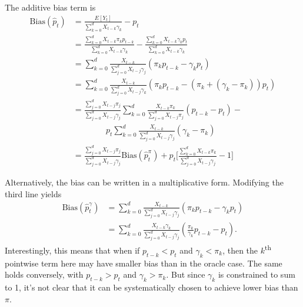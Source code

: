 \documentclass{article}
\begin{document}
The additive bias term is
\begin{align*}%
    \text{Bias}(\hat{p}_t) &= \frac{E[Y_t]}{\sum_{k=0}^d X_{t-k}\gamma_k} - p_t \\
    &= \frac{\sum_{k=0}^d X_{t-k}\pi_k p_{t-k}}{\sum_{k=0}^d X_{t-k}\gamma_k} - \frac{\sum_{k=0}^d X_{t-k}\gamma_k p_t}{\sum_{k=0}^d X_{t-k}\gamma_k} \\
    &= \sum_{k=0}^d \frac{X_{t-k}}{\sum_{j=0}^d X_{t-j}\gamma_j}(\pi_k p_{t-k}-\gamma_k p_t) \\
    &= \sum_{k=0}^d \frac{X_{t-k}}{\sum_{j=0}^d X_{t-j}\gamma_k}(\pi_k p_{t-k}-(\pi_k +(\gamma_k-\pi_k)) p_t) \\
     &= \frac{\sum_{j=0}^d X_{t-j}\pi_j}{\sum_{j=0}^d X_{t-j}\gamma_j}\sum_{k=0}^d \frac{X_{t-k}\pi_k}{\sum_{j=0}^d X_{t-j}\pi_j}(p_{t-k}-p_t) -\\
     &\qquad\qquad p_t\sum_{k=0}^d \frac{X_{t-k}}{\sum_{j=0}^d X_{t-j}\gamma_j}(\gamma_k -\pi_k)  \\
     &= \frac{\sum_{j=0}^d X_{t-j}\pi_j}{\sum_{j=0}^d X_{t-j}\gamma_j}\text{Bias}(\hat{p}_t^\pi) + p_t\Big[ \frac{\sum_{k=0}^d X_{t-k}\pi_k}{\sum_{j=0}^d X_{t-j}\gamma_j}-1\Big]
\end{align*}

Alternatively, the bias can be written in a multiplicative form. Modifying the third line yields
\begin{align}
        \text{Bias}(\hat{p}_t^\gamma) &= \sum_{k=0}^d \frac{X_{t-k}}{\sum_{j=0}^d X_{t-j}\gamma_j}(\pi_k p_{t-k}-\gamma_k p_t)\nonumber \\
        &= \sum_{k=0}^d \frac{X_{t-k}\gamma_k}{\sum_{j=0}^d X_{t-j}\gamma_j}(\frac{\pi_k}{\gamma_k} p_{t-k}- p_t).
\end{align}
Interestingly, this means that when if $p_{t-k} < p_t$ and $\gamma_k < \pi_k$, then the $k$\textsuperscript{th} pointwise term here may have smaller bias than in the oracle case. The same holds conversely, with $p_{t-k} > p_t$ and $\gamma_k > \pi_k$. But since $\gamma_k$ is constrained to sum to 1, it’s not clear that it can be systematically chosen to achieve lower bias than $\pi$.
\end{document}
